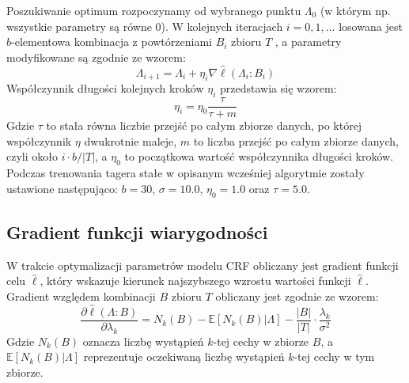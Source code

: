 \documentclass[a4paper,10]{article}
\newcommand{\comment}[2]{\noindent{{\scriptsize\sffamily(\marginpar{\sffamily #1}#2)}}}
\newcommand{\jw}[1]{\comment{\tiny{JW}}{\textcolor{blue}{#1}}}
\begin{document}
Poszukiwanie optimum rozpoczynamy od wybranego punktu $\Lambda_0$
(w którym np. wszystkie parametry są równe $0$). 
W kolejnych iteracjach $i = 0, 1, \ldots$ losowana jest $b$-elementowa
kombinacja z powtórzeniami $B_i$ zbioru $T$ \jw{powyższy opis metody SGD
sugeruje inne podejście -- zbiór $T$ jest losowo dzielony na
$b$-elementowe części, na kolejnych częściach obliczany jest gradient
i tak w kółko.}, a parametry modyfikowane są zgodnie ze wzorem:
\begin{equation}
\Lambda_{i+1} = \Lambda_i + \eta_i \nabla \hat \ell (\Lambda_i : B_i)
\end{equation}
Współczynnik długości kolejnych kroków $\eta_i$ przedstawia się wzorem:
\begin{equation}
\eta_i = \eta_0 \frac{\tau}{\tau + m}
\end{equation}
Gdzie $\tau$ to stała równa liczbie przejść po całym zbiorze danych,
po której współczynnik $\eta$ dwukrotnie maleje, $m$ to liczba
przejść po całym zbiorze danych, czyli około $i \cdot b / |T|$, a $\eta_0$
to początkowa wartość współczynnika długości kroków.
Podczas trenowania tagera stałe w opisanym wcześniej algorytmie zostały
ustawione następująco: $b = 30$, $\sigma = 10.0$, $\eta_0 = 1.0$ oraz
$\tau = 5.0$.

\subsection{Gradient funkcji wiarygodności}

W trakcie optymalizacji parametrów modelu CRF obliczany jest gradient
funkcji celu $\hat\ell$, który wskazuje kierunek najszybszego wzrostu wartości
funkcji $\hat\ell$. Gradient względem kombinacji $B$ zbioru $T$ obliczany jest
zgodnie ze wzorem:
\begin{equation}\label{eq:ll_partial}
\frac{\partial \hat \ell (\Lambda : B)}{\partial \lambda_k} =
N_k(B) - \mathbb E \left[ N_k(B) \vert \Lambda \right] -
\frac{|B|}{|T|} \cdot \frac{\lambda_k}{\sigma^2}
\end{equation}
Gdzie $N_k(B)$ oznacza liczbę wystąpień $k$-tej cechy w zbiorze $B$,
a $\mathbb E \left[ N_k(B) \vert \Lambda \right]$ reprezentuje oczekiwaną
liczbę wystąpień $k$-tej cechy w tym zbiorze.
\end{document}
